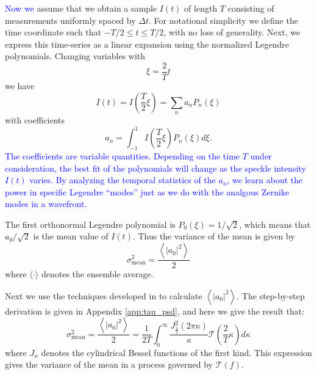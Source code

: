 \documentclass[10pt,preprint]{aastex631}
\newcommand{\jrmadd}[1]{\textcolor{blue}{#1}}
\begin{document}
\jrmadd{Now we} assume that we obtain a sample $I(t)$ of length $T$ consisting of measurements uniformly spaced by $\Delta t$.  For notational simplicity we define the time coordinate such that $-T/2 \le t \le T/2$, with no loss of generality.  Next, we express this time-series as a linear expansion using the normalized Legendre polynomials.  Changing variables with
\begin{equation}
\xi = \frac{2}{T}t
\end{equation}
we have
\begin{equation}
I(t) = I\left(\frac{T}{2}\xi\right) = \sum_n a_n P_n(\xi)
\label{eqn:basisexpansion}
\end{equation}
with coefficients
\begin{equation}
a_n = \int_{-1}^{1} I\left(\frac{T}{2}\xi\right)P_n(\xi) d\xi.
\label{eqn:expansecoeff}
\end{equation}
\jrmadd{The coefficients are variable quantities.  Depending on the time $T$ under consideration, the best fit of the polynomials will change as the speckle intensity $I(t)$ varies.  By analyzing the temporal statistics of the $a_n$, we learn about the power in specific Legendre ``modes'' just as we do with the analgous Zernike modes in a wavefront.}

The first orthonormal Legendre polynomial is $P_0(\xi) = 1/\sqrt{2}$, which means that $a_0/\sqrt{2}$ is the mean value of $I(t)$.  Thus the variance of the mean is given by
\begin{equation}
\sigma_\mathrm{mean}^2 = \frac{\left\langle \left|a_0\right|^2 \right\rangle}{2}
\label{eqn:varmean_def}
\end{equation}
where $\langle \cdot \rangle$ denotes the ensemble average.   

Next we use the techniques developed in \citet{1976JOSA...66..207N} to calculate $\left\langle \left|a_0\right|^2 \right\rangle$. The step-by-step derivation is given in Appendix \ref{app:tau_psd}, and here we give the result that:
\begin{equation}
\sigma_\mathrm{mean}^2 = \frac{\left\langle \left|a_0\right|^2 \right\rangle}{2} = \frac{1}{2T}  \int_0^{\infty} \frac{ J_{\frac{1}{2}}^2(2\pi \kappa)}{\kappa} \mathcal{T}\left( \frac{2}{T} \kappa \right) d\kappa
\label{eqn:varmean}
\end{equation}
where $J_n$ denotes the cylindrical Bessel functions of the first kind.  This expression gives the variance of the mean in a process governed by $\mathcal{T}(f)$.
\end{document}
